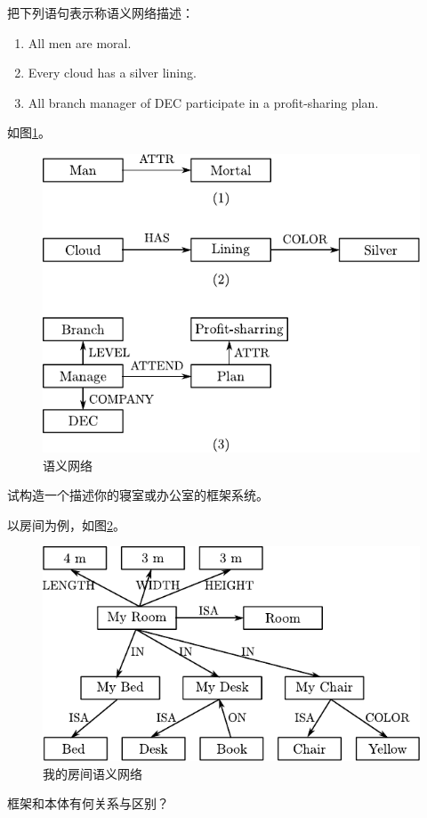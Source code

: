 \begin{question}
把下列语句表示称语义网络描述：
	\begin{enumerate}
		\item All men are moral.
		\item Every cloud has a silver lining.
		\item All branch manager of DEC participate in a profit-sharing plan. 
	\end{enumerate}
\end{question}
\begin{solution}
如图\ref{Fig:semantic-net}。
	\begin{figure}[h]
		\centering
		\includegraphics{figures/ans-2.8.pdf}
		\caption{ 语义网络 } \label{Fig:semantic-net}
	\end{figure}
\end{solution}

\begin{question}
试构造一个描述你的寝室或办公室的框架系统。
\end{question}
\begin{solution}
以房间为例，如图\ref{Fig:semantic-my-room}。
	\begin{figure}[h]
		\centering
		\includegraphics{figures/ans-2.9.pdf}
		\caption{ 我的房间语义网络 } \label{Fig:semantic-my-room}
	\end{figure}
\end{solution}

\begin{question}
框架和本体有何关系与区别？
\end{question}
\begin{solution}
\end{solution}